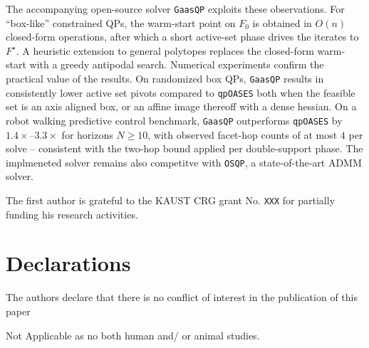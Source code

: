 \documentclass[pdflatex,sn-mathphys-num]{sn-jnl}%
\theoremstyle{thmstyleone}%
\theoremstyle{thmstyletwo}%
\theoremstyle{thmstylethree}%
\theoremstyle{thmstylethree}%
\begin{document}
The accompanying open-source solver \texttt{GaasQP} exploits these observations. For \enquote{box-like} constrained QPs, the warm-start point on $F_0$ is obtained in $O(n)$ closed-form operations, after which a short active-set phase drives the iterates to $F^\star$.
A heuristic extension to general polytopes replaces the closed-form warm-start with a greedy antipodal search.
Numerical experiments confirm the practical value of the results.
On randomized box QPs, \texttt{GaasQP} results in consistently lower active set pivots compared to \texttt{qpOASES} both when the feasible set is an axis aligned box, or an affine image thereoff with a dense hessian.
On a robot walking predictive control benchmark, \texttt{GaasQP} outperforms \texttt{qpOASES} by $1.4\times$--$3.3\times$ for horizons $N\ge10$, with observed facet-hop counts of at most $4$ per solve -- consistent with the two-hop bound applied per double-support phase. The implmeneted solver remains also competitve with \texttt{OSQP}, a state-of-the-art ADMM solver.



The first author is grateful to the KAUST CRG grant No. \texttt{XXX} for partially funding his research activities.


\section*{Declarations}


 The authors declare that there is no conflict of interest in the publication of this paper


 Not Applicable as no both human and/ or animal studies.

\end{document}
